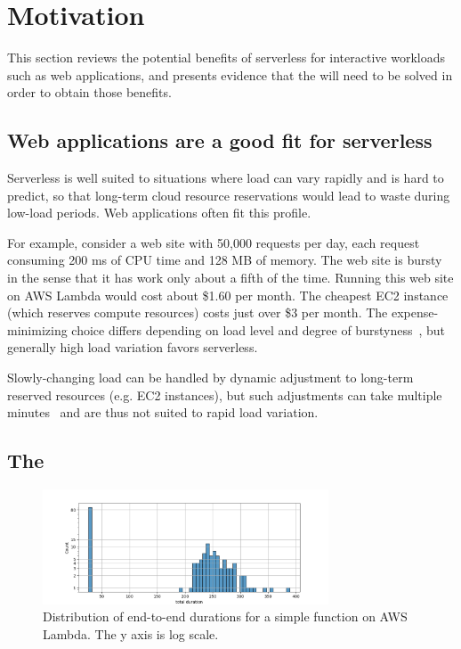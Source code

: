 \section{Motivation}\label{s:motivation}

This section reviews the potential benefits of serverless for
interactive workloads such as web applications, and presents
evidence that the {\problem} will need to be solved in order to
obtain those benefits.

\subsection{Web applications are a good fit for serverless}

Serverless is well suited to situations where load can vary rapidly
and is hard to predict, so that long-term cloud resource reservations
would lead to waste during low-load periods. Web applications often
fit this profile.

For example, consider a web site with 50,000 requests per day, each
request consuming 200 ms of CPU time and 128 MB of memory. The web
site is bursty in the sense that it has work only about a fifth of the
time. Running this web site on AWS Lambda would cost about \$1.60 per
month. The cheapest EC2 instance (which reserves compute resources)
costs just over \$3 per month. The expense-minimizing choice differs
depending on load level and degree of
burstyness~\cite{econ-of-serverless,trek10-blog},
but generally high load variation favors serverless.

Slowly-changing load can be handled by dynamic adjustment to long-term
reserved resources (e.g. EC2 instances), but such adjustments can take
multiple minutes~\cite{ec2-autoscaling} and are thus not suited to
rapid load variation.

\subsection{The \problem{}}

\begin{figure}[t!]
    \centering
      \includegraphics[width=8.5cm]{img/lambda_total_durations.png}
      \caption{Distribution of end-to-end durations for a simple function on AWS Lambda. The y axis is log scale. }
    \label{fig:lambda-total-durations}
\end{figure}

